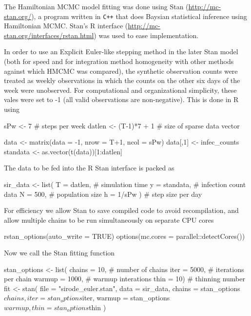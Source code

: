 \documentclass[12pt]{article}
\begin{document}
    The Hamiltonian MCMC model fitting was done using Stan (\url{http://mc-stan.org/}), a program written in \verb|C++| that does Baysian statistical inference using Hamiltonian MCMC. Stan's R interface (\url{http://mc-stan.org/interfaces/rstan.html}) was used to ease implementation.

    In order to use an Explicit Euler-like stepping method in the later Stan model (both for speed and for integration method homogeneity with other methods against which HMCMC was compared), the synthetic observation counts were treated as weekly observations in which the counts on the other six days of the week were unobserved. For computational and organizational simplicity, these vales were set to -1 (all valid observations are non-negative). This is done in R using

    \begin{R}
    sPw <- 7               # steps per week
    datlen <- (T-1)*7 + 1  # size of sparse data vector

    data <- matrix(data = -1, nrow = T+1, ncol = sPw)
    data[,1] <- infec_counts
    standata <- as.vector(t(data))[1:datlen]
    \end{R}

    The data to be fed into the R Stan interface is packed as

    \begin{R}
    sir_data <- list( T = datlen,    # simulation time
                     y = standata,  # infection count data
                     N = 500,       # population size
                     h = 1/sPw )    # step size per day 
    \end{R}

    For efficiency we allow Stan to save compiled code to avoid recompilation, and allow multiple chains to be run simultaneously on separate CPU cores

    \begin{R}
    rstan_options(auto_write = TRUE)
    options(mc.cores = parallel::detectCores())
    \end{R}

    Now we call the Stan fitting function

    \begin{R}
    stan_options <- list( chains = 10,   # number of chains
                         iter   = 5000, # iterations per chain
                         warmup = 1000, # warmup interations
                         thin   = 10)   # thinning number
    fit <- stan( file    = "sirode_euler.stan",
                data    = sir_data,
                chains  = stan_options$chains,
                iter    = stan_options$iter,
                warmup  = stan_options$warmup,
                thin    = stan_options$thin )
    \end{R}
\end{document}
